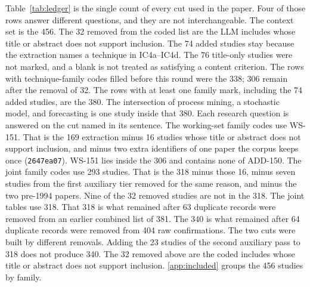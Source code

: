 Table~\ref{tab:ledger} is the single count of every cut used in the
paper. Four of those rows answer different questions, and they are not
interchangeable. The context set is the 456. The 32 removed from the
coded list are the LLM includes whose title or abstract does not support
inclusion. The 74 added studies stay because the extraction names a
technique in IC4a--IC4d. The 76 title-only studies were not marked, and a
blank is not treated as satisfying a content criterion. The rows with
technique-family codes filled before this round were the 338; 306 remain
after the removal of 32. The rows with at least one family mark, including
the 74 added studies, are the 380. The intersection of process mining, a
stochastic model, and forecasting is one study inside that 380.
Each research question is answered on the cut named in its sentence. The
working-set family codes use WS-151. That is the 169 extraction minus
16 studies whose title or abstract does not support inclusion, and minus
two extra identifiers of one paper the corpus keeps once
(\texttt{2647ea07}). WS-151 lies inside the 306 and contains none of
ADD-150. The joint family codes use 293 studies. That is the
318 minus those 16, minus seven studies from the first auxiliary tier
removed for the same reason, and minus the two pre-1994 papers. Nine of
the 32 removed studies are not in the 318.
The joint tables use 318. That 318 is what remained after 63 duplicate
records were removed from an earlier combined list of 381. The 340 is what
remained after 64 duplicate records were removed from 404 raw
confirmations. The two cuts were built by different removals. Adding the
23 studies of the second auxiliary pass to 318 does not produce 340. The
32 removed above are the coded includes whose title or abstract does not
support inclusion. \ref{app:included} groups the 456 studies by
family.


